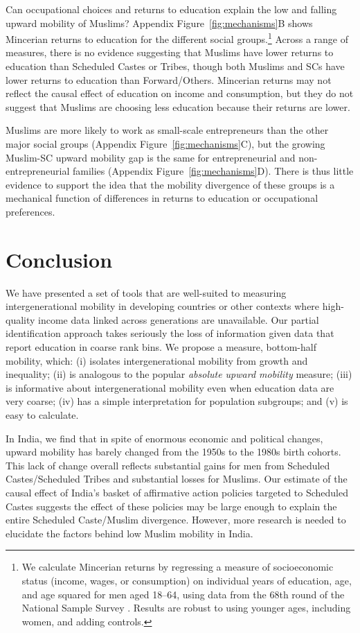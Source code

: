 \documentclass[12pt,letterpaper]{article}
\numberwithin{equation}{section}
\begin{document}
Can occupational choices and returns to education explain the low and falling upward mobility of Muslims? Appendix Figure~\ref{fig:mechanisms}B shows Mincerian returns to education for the different social groups.\footnote{We calculate Mincerian returns by regressing a measure of socioeconomic status (income, wages, or consumption) on individual years of education, age, and age squared for men aged 18--64, using data from the 68th round of the National Sample Survey \cite{nss68}. Results are robust to using younger ages, including women, and adding  controls.} Across a range of measures, there is no evidence suggesting that Muslims have lower returns to education than Scheduled Castes or Tribes, though both Muslims and SCs have lower returns to education than Forward/Others. Mincerian returns may not reflect the causal effect of education on income and consumption, but they do not suggest that Muslims are choosing less education because their returns are lower.

Muslims are more likely to work as small-scale entrepreneurs than the other major social groups (Appendix Figure~\ref{fig:mechanisms}C), but the growing Muslim-SC upward mobility gap is the same for entrepreneurial and non-entrepreneurial families (Appendix Figure~\ref{fig:mechanisms}D). There is thus little evidence to support the idea that the mobility divergence of these groups is a mechanical function of differences in returns to education or occupational preferences.

\section{Conclusion}
\label{sec:conc}

We have presented a set of tools that are well-suited to measuring intergenerational mobility in developing countries or other contexts where high-quality income data linked across generations are unavailable. Our partial identification approach takes seriously the loss of information given data that report education in coarse rank bins. We propose a measure, bottom-half mobility, which: (i) isolates intergenerational mobility from growth and inequality; (ii) is analogous to the popular \textit{absolute upward mobility} measure; (iii) is informative about intergenerational mobility even when education data are very coarse; (iv) has a simple interpretation for population subgroups; and (v) is easy to calculate. 

In India, we find that in spite of enormous economic and political changes, upward mobility has barely changed from the 1950s to the 1980s birth cohorts. This lack of change overall reflects substantial gains for men from Scheduled Castes/Scheduled Tribes and substantial losses for Muslims. Our estimate of the causal effect of India's basket of affirmative action policies targeted to Scheduled Castes suggests the effect of these policies may be large enough to explain the entire Scheduled Caste/Muslim divergence. However, more research is needed to elucidate the factors behind low Muslim mobility in India.
\end{document}
